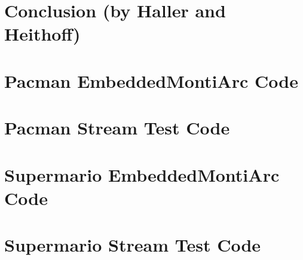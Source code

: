 \documentclass{elsarticle}
\begin{document}
\section{Conclusion (by Haller and Heithoff)}
\label{sec:conclusion}

\begin{appendix}
\section{Pacman EmbeddedMontiArc Code}

\section{Pacman Stream Test Code}


\clearpage
\section{Supermario EmbeddedMontiArc Code}


\clearpage
\section{Supermario Stream Test Code}

\end{appendix}

\clearpage

\end{document}
